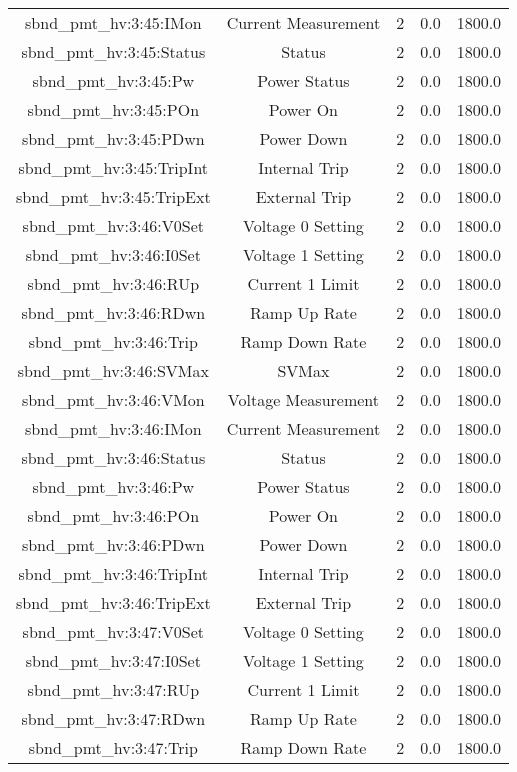 \begin{center}
\begin{longtable}{c | c c c c }
sbnd\_pmt\_hv:3:45:IMon & Current Measurement & 2 & 0.0 & 1800.0\\ 
sbnd\_pmt\_hv:3:45:Status & Status & 2 & 0.0 & 1800.0\\ 
sbnd\_pmt\_hv:3:45:Pw & Power Status & 2 & 0.0 & 1800.0\\ 
sbnd\_pmt\_hv:3:45:POn & Power On & 2 & 0.0 & 1800.0\\ 
sbnd\_pmt\_hv:3:45:PDwn & Power Down & 2 & 0.0 & 1800.0\\ 
sbnd\_pmt\_hv:3:45:TripInt & Internal Trip & 2 & 0.0 & 1800.0\\ 
sbnd\_pmt\_hv:3:45:TripExt & External Trip & 2 & 0.0 & 1800.0\\ 
sbnd\_pmt\_hv:3:46:V0Set & Voltage 0 Setting & 2 & 0.0 & 1800.0\\ 
sbnd\_pmt\_hv:3:46:I0Set & Voltage 1 Setting & 2 & 0.0 & 1800.0\\ 
sbnd\_pmt\_hv:3:46:RUp & Current 1 Limit & 2 & 0.0 & 1800.0\\ 
sbnd\_pmt\_hv:3:46:RDwn & Ramp Up Rate & 2 & 0.0 & 1800.0\\ 
sbnd\_pmt\_hv:3:46:Trip & Ramp Down Rate & 2 & 0.0 & 1800.0\\ 
sbnd\_pmt\_hv:3:46:SVMax & SVMax & 2 & 0.0 & 1800.0\\ 
sbnd\_pmt\_hv:3:46:VMon & Voltage Measurement & 2 & 0.0 & 1800.0\\ 
sbnd\_pmt\_hv:3:46:IMon & Current Measurement & 2 & 0.0 & 1800.0\\ 
sbnd\_pmt\_hv:3:46:Status & Status & 2 & 0.0 & 1800.0\\ 
sbnd\_pmt\_hv:3:46:Pw & Power Status & 2 & 0.0 & 1800.0\\ 
sbnd\_pmt\_hv:3:46:POn & Power On & 2 & 0.0 & 1800.0\\ 
sbnd\_pmt\_hv:3:46:PDwn & Power Down & 2 & 0.0 & 1800.0\\ 
sbnd\_pmt\_hv:3:46:TripInt & Internal Trip & 2 & 0.0 & 1800.0\\ 
sbnd\_pmt\_hv:3:46:TripExt & External Trip & 2 & 0.0 & 1800.0\\ 
sbnd\_pmt\_hv:3:47:V0Set & Voltage 0 Setting & 2 & 0.0 & 1800.0\\ 
sbnd\_pmt\_hv:3:47:I0Set & Voltage 1 Setting & 2 & 0.0 & 1800.0\\ 
sbnd\_pmt\_hv:3:47:RUp & Current 1 Limit & 2 & 0.0 & 1800.0\\ 
sbnd\_pmt\_hv:3:47:RDwn & Ramp Up Rate & 2 & 0.0 & 1800.0\\ 
sbnd\_pmt\_hv:3:47:Trip & Ramp Down Rate & 2 & 0.0 & 1800.0\\ 

\end{longtable}
\end{center}
